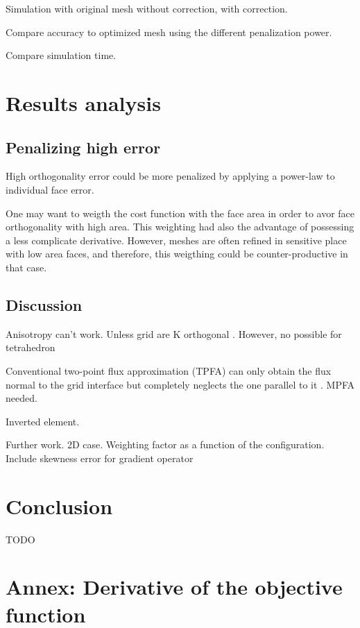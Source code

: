 \documentclass[11pt]{article}
\begin{document}
Simulation with original mesh without correction, with correction.

Compare accuracy to optimized mesh using the different penalization power.

Compare simulation time.

\section{Results analysis}

\subsection{Penalizing high error}
High orthogonality error could be more penalized by applying a power-law to individual face error. 

One may want to weigth the cost function with the face area in order to avor face orthogonality with high area. 
This weighting had also the advantage of possessing a less complicate derivative. 
However, meshes are often refined in sensitive place with low area faces, and therefore, this weigthing could be counter-productive in that case.

\subsection{Discussion}

Anisotropy can't work.
Unless grid are K orthogonal \cite{heinemann_modelling_1991}.
However, no possible for tetrahedron

Conventional two-point flux approximation (TPFA) can only obtain the flux normal to the grid interface but completely neglects the one parallel to it \cite{}. MPFA needed. %

Inverted element.

Further work.
2D case.
Weighting factor as a function of the configuration.
Include skewness error for gradient operator


\section{Conclusion}

TODO







\clearpage


\section*{Annex: Derivative of the objective function}
\end{document}
